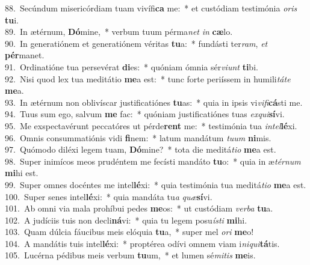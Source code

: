 {88.~}Secúndum misericórdiam tuam vivífi\textbf{ca} me:~* et custódiam testimónia \textit{o}\textit{ris} \textbf{tu}i.\\
{89.~}In ætérnum, \textbf{Dó}mine,~* verbum tuum pérma\textit{net} \textit{in} \textbf{cæ}lo.\\
{90.~}In generatiónem et generatiónem véritas \textbf{tu}a:~* fundásti ter\textit{ram}, \textit{et} \textbf{pér}manet.\\
{91.~}Ordinatióne tua persevérat \textbf{di}es:~* quóniam ómnia sér\textit{vi}\textit{unt} \textbf{ti}bi.\\
{92.~}Nisi quod lex tua meditátio \textbf{me}a est:~* tunc forte periíssem in humili\textit{tá}\textit{te} \textbf{me}a.\\
{93.~}In ætérnum non oblivíscar justificatiónes \textbf{tu}as:~* quia in ipsis vi\textit{vi}\textit{fi}\textbf{cá}sti me.\\
{94.~}Tuus sum ego, salvum \textbf{me} fac:~* quóniam justificatiónes tuas \textit{ex}\textit{qui}\textbf{sí}vi.\\
{95.~}Me exspectavérunt peccatóres ut pérde\textbf{rent} me:~* testimónia tua \textit{in}\textit{tel}\textbf{lé}xi.\\
{96.~}Omnis consummatiónis vidi \textbf{fi}nem:~* latum mandátum \textit{tu}\textit{um} \textbf{ni}mis.\\
{97.~}Quómodo diléxi legem tuam, \textbf{Dó}mine?~* tota die meditá\textit{ti}\textit{o} \textbf{me}a est.\\
{98.~}Super inimícos meos prudéntem me fecísti mandáto \textbf{tu}o:~* quia in æ\textit{tér}\textit{num} \textbf{mi}hi est.\\
{99.~}Super omnes docéntes me intel\textbf{lé}xi:~* quia testimónia tua meditá\textit{ti}\textit{o} \textbf{me}a est.\\
{100.~}Super senes intel\textbf{lé}xi:~* quia mandáta tu\textit{a} \textit{quæ}\textbf{sí}vi.\\
{101.~}Ab omni via mala prohíbui pedes \textbf{me}os:~* ut custódiam \textit{ver}\textit{ba} \textbf{tu}a.\\
{102.~}A judíciis tuis non decli\textbf{ná}vi:~* quia tu legem posu\textit{í}\textit{sti} \textbf{mi}hi.\\
{103.~}Quam dúlcia fáucibus meis elóquia \textbf{tu}a,~* super mel \textit{o}\textit{ri} \textbf{me}o!\\
{104.~}A mandátis tuis intel\textbf{lé}xi:~* proptérea odívi omnem viam i\textit{ni}\textit{qui}\textbf{tá}tis.\\
{105.~}Lucérna pédibus meis verbum \textbf{tu}um,~* et lumen sé\textit{mi}\textit{tis} \textbf{me}is.\\
